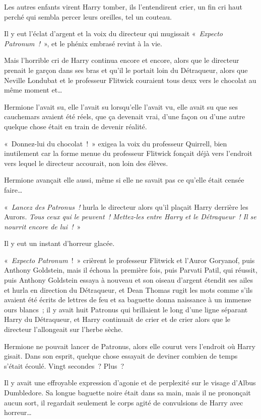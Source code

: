 \later

Les autres enfants virent Harry tomber, ils l'entendirent crier, un fin cri haut perché qui sembla percer leurs oreilles, tel un couteau.

Il y eut l'éclat d'argent et la voix du directeur qui mugissait «~\emph{Expecto Patronum~!}~», et le phénix embrasé revint à la vie.

Mais l'horrible cri de Harry continua encore et encore, alors que le directeur prenait le garçon dans ses bras et qu'il le portait loin du Détraqueur, alors que Neville Londubat et le professeur Flitwick couraient tous deux vers le chocolat au même moment et…

Hermione l'avait su, elle l'avait su lorsqu'elle l'avait vu, elle avait su que ses cauchemars avaient été réels, que ça devenait vrai, d'une façon ou d'une autre quelque chose était en train de devenir réalité.

«~Donnez-lui du chocolat~!~» exigea la voix du professeur Quirrell, bien inutilement car la forme menue du professeur Flitwick fonçait déjà vers l'endroit vers lequel le directeur accourait, non loin des élèves.

Hermione avançait elle aussi, même si elle ne savait pas ce qu'elle était censée faire…

«~\emph{Lancez des Patronus~!} hurla le directeur alors qu'il plaçait Harry derrière les Aurors. \emph{Tous ceux qui le peuvent~! Mettez-les entre Harry et le Détraqueur~! Il se nourrit encore de lui~!}~»

Il y eut un instant d'horreur glacée.

«~\emph{Expecto Patronum}~!~» crièrent le professeur Flitwick et l'Auror Goryanof, puis Anthony Goldstein, mais il échoua la première fois, puis Parvati Patil, qui réussit, puis Anthony Goldstein essaya à nouveau et son oiseau d'argent étendit ses ailes et hurla en direction du Détraqueur, et Dean Thomas rugit les mots comme s'ils avaient été écrits de lettres de feu et sa baguette donna naissance à un immense ours blancs~; il y avait huit Patronus qui brillaient le long d'une ligne séparant Harry du Détraqueur, et Harry continuait de crier et de crier alors que le directeur l'allongeait sur l'herbe sèche.

Hermione ne pouvait lancer de Patronus, alors elle courut vers l'endroit où Harry gisait. Dans son esprit, quelque chose essayait de deviner combien de temps s'était écoulé. Vingt secondes~? Plus~?

Il y avait une effroyable expression d'agonie et de perplexité sur le visage d'Albus Dumbledore. Sa longue baguette noire était dans sa main, mais il ne prononçait aucun sort, il regardait seulement le corps agité de convulsions de Harry avec horreur…

